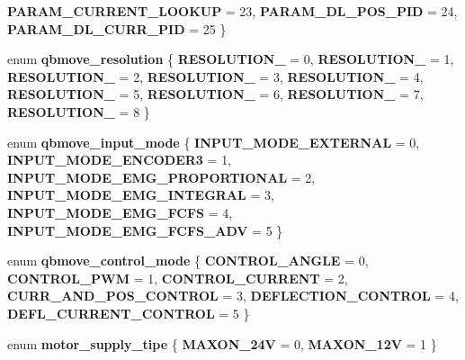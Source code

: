 \begin{DoxyCompactItemize}
\textbf{ P\+A\+R\+A\+M\+\_\+\+C\+U\+R\+R\+E\+N\+T\+\_\+\+L\+O\+O\+K\+UP} = 23, 
\textbf{ P\+A\+R\+A\+M\+\_\+\+D\+L\+\_\+\+P\+O\+S\+\_\+\+P\+ID} = 24, 
\textbf{ P\+A\+R\+A\+M\+\_\+\+D\+L\+\_\+\+C\+U\+R\+R\+\_\+\+P\+ID} = 25
 \}
\item 
\mbox{\label{commands_8h_ad18f2ef316ee226b52882af5758c39e8}} 
enum {\bfseries qbmove\+\_\+resolution} \{ \newline
{\bfseries R\+E\+S\+O\+L\+U\+T\+I\+O\+N\+\_} = 0, 
{\bfseries R\+E\+S\+O\+L\+U\+T\+I\+O\+N\+\_} = 1, 
{\bfseries R\+E\+S\+O\+L\+U\+T\+I\+O\+N\+\_} = 2, 
{\bfseries R\+E\+S\+O\+L\+U\+T\+I\+O\+N\+\_} = 3, 
\newline
{\bfseries R\+E\+S\+O\+L\+U\+T\+I\+O\+N\+\_} = 4, 
{\bfseries R\+E\+S\+O\+L\+U\+T\+I\+O\+N\+\_} = 5, 
{\bfseries R\+E\+S\+O\+L\+U\+T\+I\+O\+N\+\_} = 6, 
{\bfseries R\+E\+S\+O\+L\+U\+T\+I\+O\+N\+\_} = 7, 
\newline
{\bfseries R\+E\+S\+O\+L\+U\+T\+I\+O\+N\+\_} = 8
 \}
\item 
enum \textbf{ qbmove\+\_\+input\+\_\+mode} \{ \newline
\textbf{ I\+N\+P\+U\+T\+\_\+\+M\+O\+D\+E\+\_\+\+E\+X\+T\+E\+R\+N\+AL} = 0, 
\textbf{ I\+N\+P\+U\+T\+\_\+\+M\+O\+D\+E\+\_\+\+E\+N\+C\+O\+D\+E\+R3} = 1, 
\textbf{ I\+N\+P\+U\+T\+\_\+\+M\+O\+D\+E\+\_\+\+E\+M\+G\+\_\+\+P\+R\+O\+P\+O\+R\+T\+I\+O\+N\+AL} = 2, 
\textbf{ I\+N\+P\+U\+T\+\_\+\+M\+O\+D\+E\+\_\+\+E\+M\+G\+\_\+\+I\+N\+T\+E\+G\+R\+AL} = 3, 
\newline
\textbf{ I\+N\+P\+U\+T\+\_\+\+M\+O\+D\+E\+\_\+\+E\+M\+G\+\_\+\+F\+C\+FS} = 4, 
\textbf{ I\+N\+P\+U\+T\+\_\+\+M\+O\+D\+E\+\_\+\+E\+M\+G\+\_\+\+F\+C\+F\+S\+\_\+\+A\+DV} = 5
 \}
\item 
enum \textbf{ qbmove\+\_\+control\+\_\+mode} \{ \newline
\textbf{ C\+O\+N\+T\+R\+O\+L\+\_\+\+A\+N\+G\+LE} = 0, 
\textbf{ C\+O\+N\+T\+R\+O\+L\+\_\+\+P\+WM} = 1, 
\textbf{ C\+O\+N\+T\+R\+O\+L\+\_\+\+C\+U\+R\+R\+E\+NT} = 2, 
\textbf{ C\+U\+R\+R\+\_\+\+A\+N\+D\+\_\+\+P\+O\+S\+\_\+\+C\+O\+N\+T\+R\+OL} = 3, 
\newline
\textbf{ D\+E\+F\+L\+E\+C\+T\+I\+O\+N\+\_\+\+C\+O\+N\+T\+R\+OL} = 4, 
\textbf{ D\+E\+F\+L\+\_\+\+C\+U\+R\+R\+E\+N\+T\+\_\+\+C\+O\+N\+T\+R\+OL} = 5
 \}
\item 
\mbox{\label{commands_8h_a17c218160a8b2c5f25db27616793d564}} 
enum {\bfseries motor\+\_\+supply\+\_\+tipe} \{ {\bfseries M\+A\+X\+O\+N\+\_\+24V} = 0, 
{\bfseries M\+A\+X\+O\+N\+\_\+12V} = 1
 \}
\item 

\end{DoxyCompactItemize}
